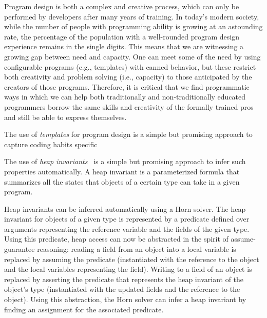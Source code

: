 Program design is both a complex and creative process, which can only 
be performed by developers after many years of training. In today's modern 
society, while the number of people with programming ability is growing 
at an astounding rate, the percentage of the population with a well-rounded 
program design experience remains in the single digits. This means that we 
are witnessing a growing gap between need and capacity. One can meet some 
of the need by using configurable programs (e.g., templates) with canned 
behavior, but these restrict both creativity and problem solving 
(i.e., capacity) to those anticipated by the creators of those programs. 
Therefore, it is critical that we find programmatic ways in which we can 
help both traditionally and non-traditionally educated programmers borrow 
the same skills and creativity of the formally trained pros and still 
be able to express themselves.

The use of \textit{templates} for program design is a simple but promising 
approach to capture coding habits specific 



The use of \emph{heap invariants}~\cite{jayhorn16} 
is a simple but promising approach to infer such
properties automatically.
A heap invariant is a parameterized formula that summarizes all the
states that objects of a certain type can take in a given program.

Heap invariants can be inferred automatically using a Horn solver. 
The heap invariant for objects of a given type is represented 
by a predicate defined over arguments representing the reference 
variable and the fields of the given
type. Using this predicate, heap access can now be abstracted in the
spirit of assume-guarantee reasoning: reading a field from an
object into a local variable is replaced by assuming the predicate
(instantiated with the reference to the object and the local variables 
representing the field). Writing to a field of an object is replaced by 
asserting the predicate that represents the heap invariant of the
object's type (instantiated with the updated fields and the reference
to the object). Using this abstraction, the Horn solver can infer
a heap invariant by finding an assignment for the associated 
predicate. 


